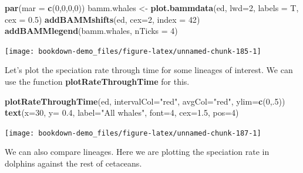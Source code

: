 \documentclass[
]{book}
\newenvironment{Shaded}{\begin{snugshade}}{\end{snugshade}}
\newcommand{\DataTypeTok}[1]{\textcolor[rgb]{0.13,0.29,0.53}{#1}}
\newcommand{\DecValTok}[1]{\textcolor[rgb]{0.00,0.00,0.81}{#1}}
\newcommand{\FloatTok}[1]{\textcolor[rgb]{0.00,0.00,0.81}{#1}}
\newcommand{\KeywordTok}[1]{\textcolor[rgb]{0.13,0.29,0.53}{\textbf{#1}}}
\newcommand{\NormalTok}[1]{#1}
\newcommand{\StringTok}[1]{\textcolor[rgb]{0.31,0.60,0.02}{#1}}
\begin{document}
\begin{Shaded}
\begin{Highlighting}[]
\KeywordTok{par}\NormalTok{(}\DataTypeTok{mar =} \KeywordTok{c}\NormalTok{(}\DecValTok{0}\NormalTok{,}\DecValTok{0}\NormalTok{,}\DecValTok{0}\NormalTok{,}\DecValTok{0}\NormalTok{))}
\NormalTok{bamm.whales \textless{}{-}}\StringTok{ }\KeywordTok{plot.bammdata}\NormalTok{(ed, }\DataTypeTok{lwd=}\DecValTok{2}\NormalTok{, }\DataTypeTok{labels =}\NormalTok{ T, }\DataTypeTok{cex =} \FloatTok{0.5}\NormalTok{)}
\KeywordTok{addBAMMshifts}\NormalTok{(ed, }\DataTypeTok{cex=}\DecValTok{2}\NormalTok{, }\DataTypeTok{index =} \DecValTok{42}\NormalTok{)}
\KeywordTok{addBAMMlegend}\NormalTok{(bamm.whales, }\DataTypeTok{nTicks =} \DecValTok{4}\NormalTok{)}
\end{Highlighting}
\end{Shaded}

\begin{center}\texttt{[image: bookdown-demo\_files/figure-latex/unnamed-chunk-185-1]} \end{center}

Let's plot the speciation rate through time for some lineages of interest. We can use the function \textbf{plotRateThroughTime} for this.

\begin{Shaded}
\begin{Highlighting}[]
\KeywordTok{plotRateThroughTime}\NormalTok{(ed, }\DataTypeTok{intervalCol=}\StringTok{"red"}\NormalTok{, }\DataTypeTok{avgCol=}\StringTok{"red"}\NormalTok{, }\DataTypeTok{ylim=}\KeywordTok{c}\NormalTok{(}\DecValTok{0}\NormalTok{,.}\DecValTok{5}\NormalTok{))}
\KeywordTok{text}\NormalTok{(}\DataTypeTok{x=}\DecValTok{30}\NormalTok{, }\DataTypeTok{y=} \FloatTok{0.4}\NormalTok{, }\DataTypeTok{label=}\StringTok{"All whales"}\NormalTok{, }\DataTypeTok{font=}\DecValTok{4}\NormalTok{, }\DataTypeTok{cex=}\FloatTok{1.5}\NormalTok{, }\DataTypeTok{pos=}\DecValTok{4}\NormalTok{)}
\end{Highlighting}
\end{Shaded}

\begin{center}\texttt{[image: bookdown-demo\_files/figure-latex/unnamed-chunk-187-1]} \end{center}

We can also compare lineages. Here we are plotting the speciation rate in dolphins against the rest of cetaceans.
\end{document}

